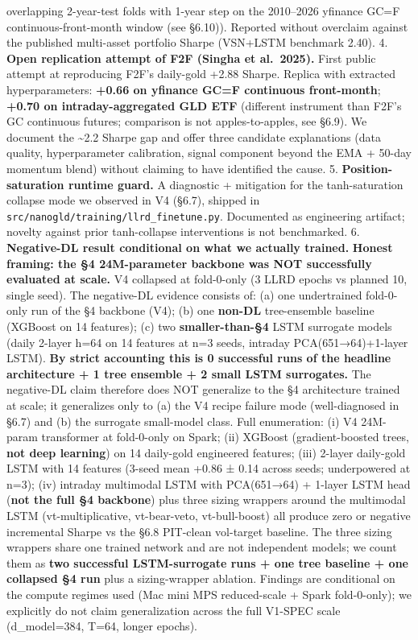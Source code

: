 \documentclass[
]{article}
\begin{document}
overlapping 2-year-test folds with 1-year step on the 2010--2026
yfinance GC=F continuous-front-month window (see §6.10)). Reported
without overclaim against the published multi-asset portfolio Sharpe
(VSN+LSTM benchmark 2.40). 4. \textbf{Open replication attempt of F2F
(Singha et al.~2025).} First public attempt at reproducing F2F's
daily-gold +2.88 Sharpe. Replica with extracted hyperparameters:
\textbf{+0.66 on yfinance GC=F continuous front-month}; \textbf{+0.70 on
intraday-aggregated GLD ETF} (different instrument than F2F's GC
continuous futures; comparison is not apples-to-apples, see §6.9). We
document the \textasciitilde2.2 Sharpe gap and offer three candidate
explanations (data quality, hyperparameter calibration, signal component
beyond the EMA + 50-day momentum blend) without claiming to have
identified the cause. 5. \textbf{Position-saturation runtime guard.} A
diagnostic + mitigation for the tanh-saturation collapse mode we
observed in V4 (§6.7), shipped in
\texttt{src/nanogld/training/llrd\_finetune.py}. Documented as
engineering artifact; novelty against prior tanh-collapse interventions
is not benchmarked. 6. \textbf{Negative-DL result conditional on what we
actually trained.} \textbf{Honest framing: the §4 24M-parameter backbone
was NOT successfully evaluated at scale.} V4 collapsed at fold-0-only (3
LLRD epochs vs planned 10, single seed). The negative-DL evidence
consists of: (a) one undertrained fold-0-only run of the §4 backbone
(V4); (b) one \textbf{non-DL} tree-ensemble baseline (XGBoost on 14
features); (c) two \textbf{smaller-than-§4} LSTM surrogate models (daily
2-layer h=64 on 14 features at n=3 seeds, intraday PCA(651→64)+1-layer
LSTM). \textbf{By strict accounting this is 0 successful runs of the
headline architecture + 1 tree ensemble + 2 small LSTM surrogates.} The
negative-DL claim therefore does NOT generalize to the §4 architecture
trained at scale; it generalizes only to (a) the V4 recipe failure mode
(well-diagnosed in §6.7) and (b) the surrogate small-model class. Full
enumeration: (i) V4 24M-param transformer at fold-0-only on Spark; (ii)
XGBoost (gradient-boosted trees, \textbf{not deep learning}) on 14
daily-gold engineered features; (iii) 2-layer daily-gold LSTM with 14
features (3-seed mean +0.86 ± 0.14 across seeds; underpowered at n=3);
(iv) intraday multimodal LSTM with PCA(651→64) + 1-layer LSTM head
(\textbf{not the full §4 backbone}) plus three sizing wrappers around
the multimodal LSTM (vt-multiplicative, vt-bear-veto, vt-bull-boost) all
produce zero or negative incremental Sharpe vs the §6.8 PIT-clean
vol-target baseline. The three sizing wrappers share one trained network
and are not independent models; we count them as \textbf{two successful
LSTM-surrogate runs + one tree baseline + one collapsed §4 run} plus a
sizing-wrapper ablation. Findings are conditional on the compute regimes
used (Mac mini MPS reduced-scale + Spark fold-0-only); we explicitly do
not claim generalization across the full V1-SPEC scale (d\_model=384,
T=64, longer epochs).
\end{document}
